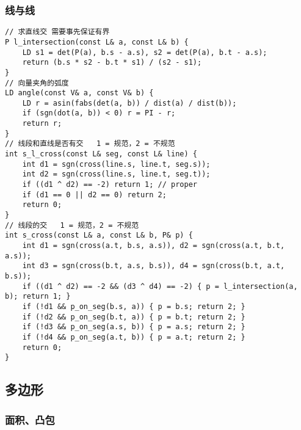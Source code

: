 \documentclass[]{article}
\begin{document}
\hypertarget{ux7ebfux4e0eux7ebf}{%
\subsubsection{线与线}\label{ux7ebfux4e0eux7ebf}}

\begin{verbatim}
// 求直线交 需要事先保证有界
P l_intersection(const L& a, const L& b) {
    LD s1 = det(P(a), b.s - a.s), s2 = det(P(a), b.t - a.s);
    return (b.s * s2 - b.t * s1) / (s2 - s1);
}
// 向量夹角的弧度
LD angle(const V& a, const V& b) {
    LD r = asin(fabs(det(a, b)) / dist(a) / dist(b));
    if (sgn(dot(a, b)) < 0) r = PI - r;
    return r;
}
// 线段和直线是否有交   1 = 规范，2 = 不规范
int s_l_cross(const L& seg, const L& line) {
    int d1 = sgn(cross(line.s, line.t, seg.s));
    int d2 = sgn(cross(line.s, line.t, seg.t));
    if ((d1 ^ d2) == -2) return 1; // proper
    if (d1 == 0 || d2 == 0) return 2;
    return 0;
}
// 线段的交   1 = 规范，2 = 不规范
int s_cross(const L& a, const L& b, P& p) {
    int d1 = sgn(cross(a.t, b.s, a.s)), d2 = sgn(cross(a.t, b.t, a.s));
    int d3 = sgn(cross(b.t, a.s, b.s)), d4 = sgn(cross(b.t, a.t, b.s));
    if ((d1 ^ d2) == -2 && (d3 ^ d4) == -2) { p = l_intersection(a, b); return 1; }
    if (!d1 && p_on_seg(b.s, a)) { p = b.s; return 2; }
    if (!d2 && p_on_seg(b.t, a)) { p = b.t; return 2; }
    if (!d3 && p_on_seg(a.s, b)) { p = a.s; return 2; }
    if (!d4 && p_on_seg(a.t, b)) { p = a.t; return 2; }
    return 0;
}
\end{verbatim}

\hypertarget{ux591aux8fb9ux5f62}{%
\subsection{多边形}\label{ux591aux8fb9ux5f62}}

\hypertarget{ux9762ux79efux51f8ux5305}{%
\subsubsection{面积、凸包}\label{ux9762ux79efux51f8ux5305}}
\end{document}

